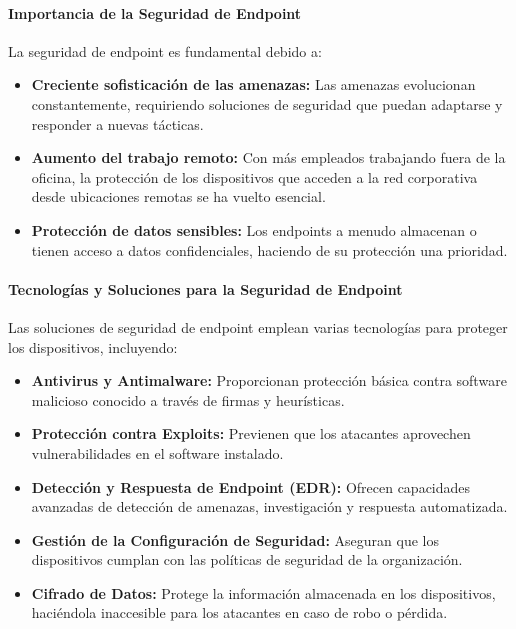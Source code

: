 \paragraph{Importancia de la Seguridad de Endpoint}

La seguridad de endpoint es fundamental debido a:

\begin{itemize}
    \item \textbf{Creciente sofisticación de las amenazas:} Las amenazas evolucionan constantemente, requiriendo soluciones de seguridad que puedan adaptarse y responder a nuevas tácticas.
    \item \textbf{Aumento del trabajo remoto:} Con más empleados trabajando fuera de la oficina, la protección de los dispositivos que acceden a la red corporativa desde ubicaciones remotas se ha vuelto esencial.
    \item \textbf{Protección de datos sensibles:} Los endpoints a menudo almacenan o tienen acceso a datos confidenciales, haciendo de su protección una prioridad.
\end{itemize}

\paragraph{Tecnologías y Soluciones para la Seguridad de Endpoint}

Las soluciones de seguridad de endpoint emplean varias tecnologías para proteger los dispositivos, incluyendo:

\begin{itemize}
    \item \textbf{Antivirus y Antimalware:} Proporcionan protección básica contra software malicioso conocido a través de firmas y heurísticas.
    \item \textbf{Protección contra Exploits:} Previenen que los atacantes aprovechen vulnerabilidades en el software instalado.
    \item \textbf{Detección y Respuesta de Endpoint (EDR):} Ofrecen capacidades avanzadas de detección de amenazas, investigación y respuesta automatizada.
    \item \textbf{Gestión de la Configuración de Seguridad:} Aseguran que los dispositivos cumplan con las políticas de seguridad de la organización.
    \item \textbf{Cifrado de Datos:} Protege la información almacenada en los dispositivos, haciéndola inaccesible para los atacantes en caso de robo o pérdida.
\end{itemize}

